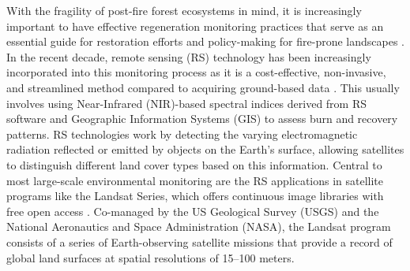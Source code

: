 \documentclass[11pt]{article}
\begin{document}
With the fragility of post-fire forest ecosystems in mind, it is increasingly important to have effective regeneration monitoring practices that serve as an essential guide for restoration efforts and policy-making for fire-prone landscapes \cite{mdpiMonitoring}. In the recent decade, remote sensing (RS) technology has been increasingly incorporated into this monitoring process as it is a cost-effective, non-invasive, and streamlined method compared to acquiring ground-based data \cite{pmcSensors}. This usually involves using Near-Infrared (NIR)-based spectral indices derived from RS software and Geographic Information Systems (GIS) to assess burn and recovery patterns. RS technologies work by detecting the varying electromagnetic radiation reflected or emitted by objects on the Earth's surface, allowing satellites to distinguish different land cover types based on this information. Central to most large-scale environmental monitoring are the RS applications in satellite programs like the Landsat Series, which offers continuous image libraries with free open access \cite{usgsLandsat}. Co-managed by the US Geological Survey (USGS) and the National Aeronautics and Space Administration (NASA), the Landsat program consists of a series of Earth-observing satellite missions that provide a record of global land surfaces at spatial resolutions of 15--100 meters.
\end{document}

